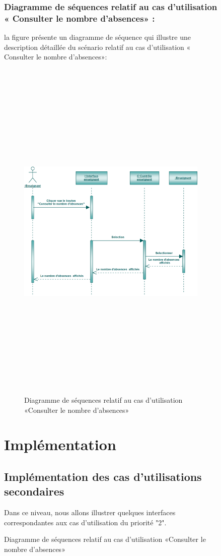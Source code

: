 \documentclass[12 pt]{report}
\begin{document}
\begin{figure}[h]
\begin{center}
\subsubsection{Diagramme de séquences relatif au cas d’utilisation « Consulter le nombre d'absences» :}
la figure   présente un diagramme de séquence qui illustre une description détaillée du scénario relatif au cas d’utilisation « Consulter le nombre d'absences»: 
\begin{figure}[h]
 \begin{center}
\includegraphics[width= 18 cm ,height=  17cm]{sca.PNG}
\caption{Diagramme de séquences relatif au cas d’utilisation «Consulter le nombre d'absences»}

\end{center}
\end{figure}
\section{Implémentation}
\subsection{Implémentation des cas d'utilisations secondaires }
Dans ce niveau, nous allons illustrer quelques interfaces correspondantes aux cas d'utilisation du priorité "2".\\


\end{center}
\end{figure}
\end{document}
